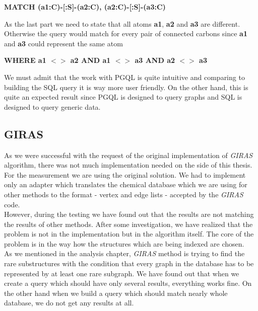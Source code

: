 {\begin{center}
	\textbf{MATCH (a1:C)-[:S]-(a2:C), (a2:C)-[:S]-(a3:C)}
\end{center}

As the last part we need to state that all atoms \textbf{a1}, \textbf{a2} and \textbf{a3} are different. Otherwise the query would match for every pair of connected carbons since \textbf{a1} and \textbf{a3} could represent the same atom

\begin{center}
	\textbf{WHERE a1 $<>$ a2 AND a1 $<>$ a3 AND a2 $<>$ a3}
\end{center}

We must admit that the work with PGQL is quite intuitive and comparing to building the SQL query it is way more user friendly. On the other hand, this is quite an expected result since PGQL is designed to query graphs and SQL is designed to query generic data.

\subsection{GIRAS}

As we were successful with the request of the original implementation of \textit{GIRAS} algorithm, there was not much implementation needed on the side of this thesis. For the measurement we are using the original solution. We had to implement only an adapter which translates the chemical database which we are using for other methods to the format - vertex and edge lists - accepted by the \textit{GIRAS} code.\\

However, during the testing we have found out that the results are not matching the results of other methods. After some investigation, we have realized that the problem is not in the implementation but in the algorithm itself. The core of the problem is in the way how the structures which are being indexed are chosen.\\

As we mentioned in the analysis chapter, \textit{GIRAS} method is trying to find the rare substructures with the condition that every graph in the database has to be represented by at least one rare subgraph. We have found out that when we create a query which should have only several results, everything works fine. On the other hand when we build a query which should match nearly whole database, we do not get any results at all.\\

}
